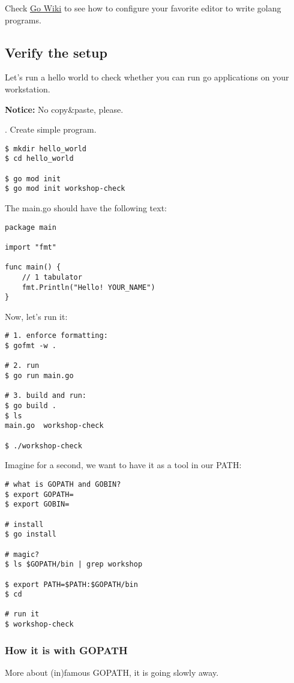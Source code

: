 \documentclass[11pt, letterpaper]{article}
\begin{document}
Check \href{https://github.com/golang/go/wiki/IDEsAndTextEditorPlugins}{Go Wiki} to see how to configure your favorite editor to write golang programs.

\subsection{Verify the setup}
Let's run a hello world to check whether you can run go applications on your workstation.

\bigskip
\textbf{Notice:} No copy\&paste, please.

. Create simple program.

\begin{verbatim}
$ mkdir hello_world
$ cd hello_world

$ go mod init
$ go mod init workshop-check
\end{verbatim}

The main.go should have the following text:

\begin{verbatim}
package main

import "fmt"

func main() {
    // 1 tabulator
    fmt.Println("Hello! YOUR_NAME")
}
\end{verbatim}

Now, let's run it:

\begin{verbatim}
# 1. enforce formatting:
$ gofmt -w .

# 2. run
$ go run main.go

# 3. build and run:
$ go build .
$ ls
main.go  workshop-check

$ ./workshop-check
\end{verbatim}

Imagine for a second, we want to have it as a tool in our PATH: 

\begin{verbatim}
# what is GOPATH and GOBIN?
$ export GOPATH=
$ export GOBIN=

# install
$ go install

# magic?
$ ls $GOPATH/bin | grep workshop

$ export PATH=$PATH:$GOPATH/bin
$ cd

# run it
$ workshop-check
\end{verbatim}

\subsubsection{How it is with {\small GOPATH}}
More about (in)famous {\small GOPATH}, it is going slowly away.
\end{document}
